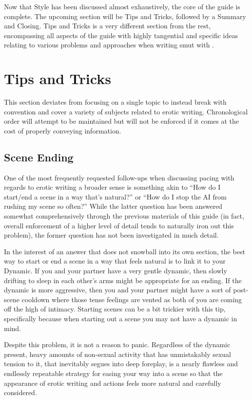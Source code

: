 \documentclass[Coomer-main.tex]{subfiles}
\begin{document}
Now that Style has been discussed almost exhaustively, the core of the guide is complete.
The upcoming section will be Tips and Tricks, followed by a Summary and Closing.
Tips and Tricks is a very different section from the rest, encompassing all aspects of the guide with highly tangential and specific ideas relating to various problems and approaches when writing smut with \aid.

\chapter{Tips and Tricks}
\label{ch:tips}

This section deviates from focusing on a single topic to instead break with convention and cover a variety of subjects related to erotic writing.
Chronological order will attempt to be maintained but will not be enforced if it comes at the cost of properly conveying information.

\section{Scene Ending}
\label{sec:sceneend}

One of the most frequently requested follow-ups when discussing pacing with regards to erotic writing a broader sense is something akin to “How do I start/end a scene in a way that’s natural?” or “How do I stop the AI from rushing my scene so often?” While the latter question has been answered somewhat comprehensively through the previous materials of this guide (in fact, overall enforcement of a higher level of detail tends to naturally iron out this problem), the former question has not been investigated in much detail.

In the interest of an answer that does not snowball into its own section, the best way to start or end a scene in a way that feels natural is to link it to your Dynamic.
If you and your partner have a very gentle dynamic, then slowly drifting to sleep in each other’s arms might be appropriate for an ending.
If the dynamic is more aggressive, then you and your partner might have a sort of post-scene cooldown where those tense feelings are vented as both of you are coming off the high of intimacy.
Starting scenes can be a bit trickier with this tip, specifically because when starting out a scene you may not have a dynamic in mind.

Despite this problem, it is not a reason to panic.
Regardless of the dynamic present, heavy amounts of non-sexual activity that has unmistakably sexual tension to it, that inevitably segues into deep foreplay, is a nearly flawless and endlessly repeatable strategy for easing your way into a scene so that the appearance of erotic writing and actions feels more natural and carefully considered.
\end{document}
